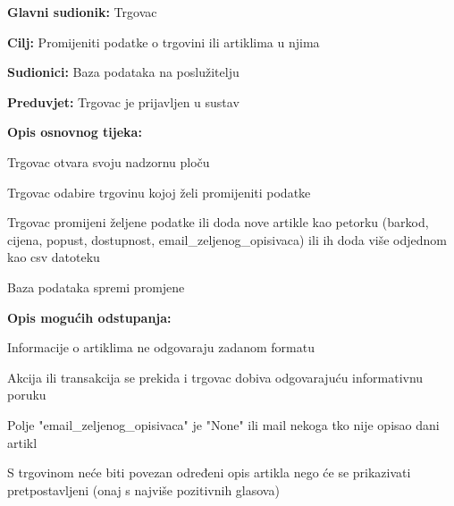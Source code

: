 				
				\noindent {}
				\begin{packed_item}
					\item \textbf{Glavni sudionik:} Trgovac
					\item  \textbf{Cilj:} Promijeniti podatke o trgovini ili artiklima u njima
					\item  \textbf{Sudionici:} Baza podataka na poslužitelju
					\item  \textbf{Preduvjet:} Trgovac je prijavljen u sustav
					\item  \textbf{Opis osnovnog tijeka:}
					\item[] \begin{packed_enum}
						\item Trgovac otvara svoju nadzornu ploču
						\item Trgovac odabire trgovinu kojoj želi promijeniti podatke
						\item Trgovac promijeni željene podatke ili doda nove artikle kao petorku (barkod, cijena, popust, dostupnost, email\_zeljenog\_opisivaca) ili ih doda više odjednom kao csv datoteku
						\item Baza podataka spremi promjene
					\end{packed_enum}
					\item  \textbf{Opis mogućih odstupanja:}
					\item[] \begin{packed_item}
						\item[3.a] Informacije o artiklima ne odgovaraju zadanom formatu
						\item[] \begin{packed_enum}
							\item Akcija ili transakcija se prekida i trgovac dobiva odgovarajuću informativnu poruku
						\end{packed_enum}
						\item[3.b] Polje "email\_zeljenog\_opisivaca" je "None" ili mail nekoga tko nije opisao dani artikl
						\item[] \begin{packed_enum}
							\item S trgovinom neće biti povezan određeni opis artikla nego će se prikazivati pretpostavljeni (onaj s najviše pozitivnih glasova)
						\end{packed_enum}
					\end{packed_item}
				\end{packed_item}
			
